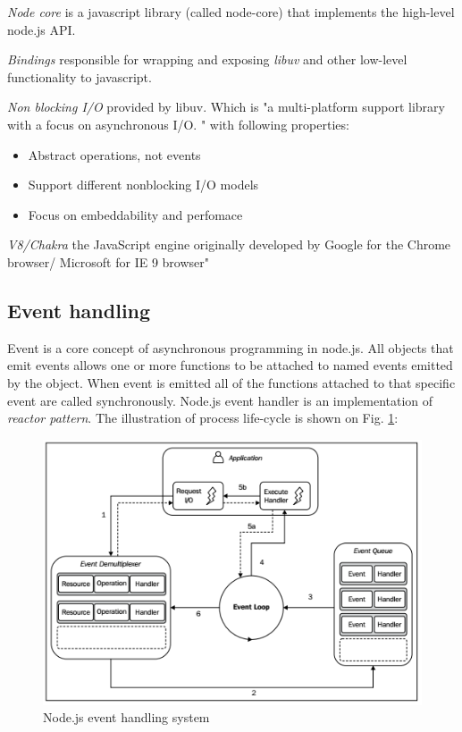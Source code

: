 \textit{Node core} is a javascript library (called node-core) that implements the high-level node.js API.

\textit{Bindings} responsible for wrapping and exposing \textit{libuv} and other low-level functionality to javascript.\cite{nodejsbook}

\textit{Non blocking I/O} provided by libuv\cite{nodejsabout}\cite{nodejsbook}. 
Which is "a multi-platform support library with a focus on asynchronous I/O. "\cite{libuv} with following properties\cite{libuvBasic}:
\begin{itemize}
\item Abstract operations, not events
\item Support different nonblocking I/O models
\item Focus on embeddability and perfomace
\end{itemize}

\textit{V8/Chakra} the JavaScript engine originally developed by Google for the Chrome browser/ Microsoft for IE 9 browser"\cite{nodejsbook} 

\subsection{Event handling}
Event is a core concept of asynchronous programming in node.js. All objects that emit events allows one or more functions to be attached to named events emitted by the object. When event is emitted all of the functions attached to that specific event are called synchronously\cite{events}. Node.js  event handler is an implementation of \textit{reactor pattern}. The illustration of process life-cycle is shown on Fig. \ref{fig:nodeEvent}:

\begin{figure}[ht]
  	\label{fig:nodeEvent}
    \centering
    \includegraphics[width=\textwidth]{grafiken/nodeEventHandling.png}
     \caption{Node.js event handling system \cite{nodejsbook}}
  \end{figure}

